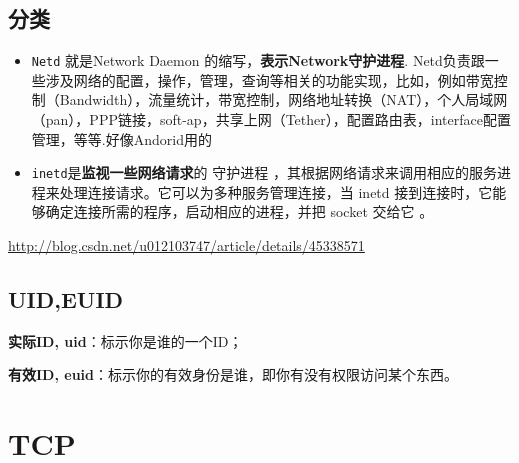 \documentclass[UTF8,a4paper,12pt]{ctexbook}
\begin{document}
		\subsection{分类}
			\begin{itemize}
				\item \verb|Netd| 就是Network Daemon 的缩写，\textbf{表示Network守护进程}. Netd负责跟一些涉及网络的配置，操作，管理，查询等相关的功能实现，比如，例如带宽控制（Bandwidth），流量统计，带宽控制，网络地址转换（NAT），个人局域网（pan），PPP链接，soft-ap，共享上网（Tether），配置路由表，interface配置管理，等等.好像Andorid用的
				
				\item \verb|inetd|是\textbf{监视一些网络请求}的 守护进程 ，其根据网络请求来调用相应的服务进程来处理连接请求。它可以为多种服务管理连接，当 inetd 接到连接时，它能够确定连接所需的程序，启动相应的进程，并把 socket 交给它 。
			\end{itemize}	
		\url{http://blog.csdn.net/u012103747/article/details/45338571}
		
		\subsection{UID,EUID}
			\textbf{实际ID, uid}：标示你是谁的一个ID；
			 
			\textbf{有效ID, euid}：标示你的有效身份是谁，即你有没有权限访问某个东西。
	\section{TCP}
\end{document}
